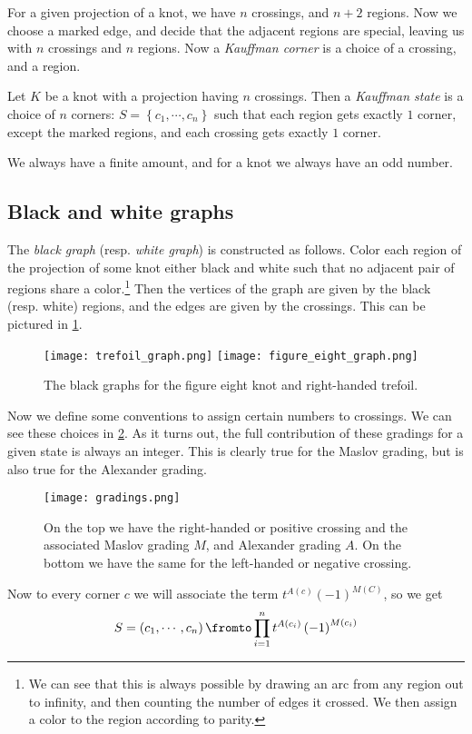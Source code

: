 \documentclass{amsproc}
\begin{document}
For a given projection of a knot, we have $n$ crossings, 
and $n+2$ regions. 
Now we choose a marked edge, and decide that the adjacent regions
are special, leaving us with $n$ crossings and $n$ regions. 
Now a \emph{Kauffman corner} is a choice of a crossing, and a region.

\begin{defn}
Let $K$ be a knot with a projection having $n$ crossings. 
Then a \emph{Kauffman state} is a choice of $n$ corners:
$S = \left\{ c_1 , \cdots , c_n \right\}$ such that each region gets exactly $1$ corner, 
except the marked regions, and each crossing gets exactly $1$ corner.
\end{defn}

We always have a finite amount, and for a knot we always have an odd number.

\subsection{Black and white graphs}

The \emph{black graph} (resp. \emph{white graph})
is constructed as follows.
Color each region of the projection of some knot either black and white such that
no adjacent pair of regions share a color.\footnote{
We can see that this is always possible by drawing an arc from any region
out to infinity, and then counting the number of edges it crossed. 
We then assign a color to the region according to parity.}
Then the vertices of the graph are given by the black (resp. white) regions, 
and the edges are given by the crossings.
This can be pictured in \cref{fig:graph_examples}.
\begin{figure}
\texttt{[image: trefoil\_graph.png]}
\texttt{[image: figure\_eight\_graph.png]}
\caption{The black graphs for the figure eight knot and right-handed
trefoil.}
\label{fig:graph_examples}
\end{figure}

Now we define some conventions to assign certain numbers to crossings.
We can see these choices in \cref{fig:pos_neg_crossings}.
As it turns out, the full contribution of these gradings for a given state is always an integer.
This is clearly true for the Maslov grading, but is also true for the Alexander grading.
\begin{figure}
\texttt{[image: gradings.png]}
\caption{On the top we have the right-handed or positive crossing and the
associated Maslov grading $M$, and Alexander grading $A$. 
On the bottom we have the same for the left-handed or negative crossing.}
\label{fig:pos_neg_crossings}
\end{figure}
Now to every corner $c$ we will associate the term 
$t^{A\left( c \right)} \left( -1 \right)^{M\left( C \right)}$, so we get 
\begin{equation}
S = \left( c_1 , \cdots , c_n \right)
\fromto
\prod_{i = 1}^n t^{A\left( c_i \right)} \left( -1 \right)^{M\left( c_i \right)}
\end{equation}
\end{document}
